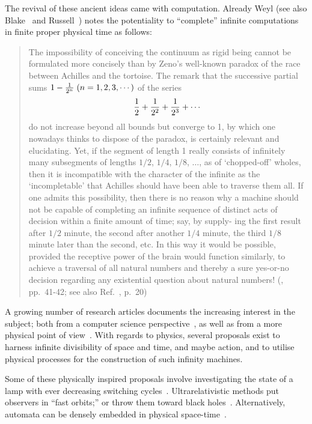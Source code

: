 \documentclass{comjnl}
\begin{document}
The revival of these ancient ideas came with computation.
Already Weyl (see also Blake~\cite[p.~651]{Blake26} and Russell~\cite[p.~144]{Russell-36}) notes the potentiality to ``complete'' infinite computations in
finite proper physical time as follows:
\begin{quote}
The impossibility of conceiving the continuum as rigid being cannot
be formulated more concisely than by Zeno's well-known paradox of
the race between Achilles and the tortoise. The remark that the
successive partial sums $1 - {1\over 2^n}\;  (n = 1, 2, 3, \cdots )$ of the series
$$
{1\over 2}+
{1\over 2^2}+
{1\over 2^3}+
\cdots
$$
do not increase beyond all bounds but converge to 1, by which one
nowadays thinks to dispose of the paradox, is certainly relevant and
elucidating. Yet, if the segment of length 1 really consists of infinitely
many subsegments of lengths $1/2$, $1/4$, $1/8$, $\ldots$, as of `chopped-off'
wholes, then it is incompatible with the character of the infinite as the
`incompletable' that Achilles should have been able to traverse them
all. If one admits this possibility, then there is no reason why a
machine should not be capable of completing an infinite sequence of
distinct acts of decision within a finite amount of time; say, by supply-
ing the first result after $1/2$ minute, the second after another $1/4$ minute,
the third $1/8$ minute later than the second, etc. In this way it would
be possible, provided the receptive power of the brain would function
similarly, to achieve a traversal of all natural numbers and thereby a
sure yes-or-no decision regarding any existential question about natural
numbers!
(\cite{weyl:49}, pp.~41-42; see also  Ref.~\cite{benna:64}, p.~20)
\end{quote}

A growing number of research articles documents the increasing interest in the subject;
both from a computer science perspective~\cite{1011191,potgieter-06}, as well as from a more physical point of view~\cite{gruenbaum:68,pit:90,sv-aut-rev,1612095}.
With regards to physics, several proposals exist to harness infinite divisibility of space and time, and maybe action,
and to utilise physical processes for the construction of such infinity machines.

Some of these physically inspired proposals
involve investigating the state of a lamp with ever decreasing switching cycles~\cite{thom:54,benna:62,thom:54a,salmon-01,1612095}.
Ultrarelativistic methods put observers in ``fast orbits;'' or throw them toward
black holes~\cite{Hogarth92,hogarth1,hogarth2,Hogarth04,ear-nor:93,en96,siegel95,nemeti-06,DBLP:conf/mcu/Durand-Lose04,Nemeti2006118,andreka-2009}.
Alternatively, automata can  be densely embedded in physical space-time~\cite{2008-sica}.
\end{document}
